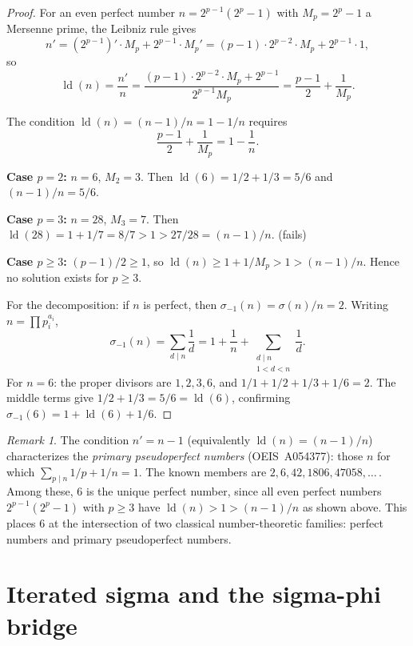 \documentclass[11pt]{amsart}
\theoremstyle{remark}
\newtheorem*{remark}{Remark}
\begin{document}
\begin{proof}
For an even perfect number $n = 2^{p-1}(2^p - 1)$ with
$M_p = 2^p - 1$ a Mersenne prime, the Leibniz rule gives
\[
  n' = (2^{p-1})' \cdot M_p + 2^{p-1} \cdot M_p'
     = (p-1) \cdot 2^{p-2} \cdot M_p + 2^{p-1} \cdot 1,
\]
so
\[
  \operatorname{ld}(n) = \frac{n'}{n}
  = \frac{(p-1) \cdot 2^{p-2} \cdot M_p + 2^{p-1}}{2^{p-1} M_p}
  = \frac{p-1}{2} + \frac{1}{M_p}.
\]

The condition $\operatorname{ld}(n) = (n-1)/n = 1 - 1/n$ requires
\[
  \frac{p-1}{2} + \frac{1}{M_p} = 1 - \frac{1}{n}.
\]

\textbf{Case $p = 2$:} $n = 6$, $M_2 = 3$.
Then $\operatorname{ld}(6) = 1/2 + 1/3 = 5/6$
and $(n-1)/n = 5/6$. \checkmark

\textbf{Case $p = 3$:} $n = 28$, $M_3 = 7$.
Then $\operatorname{ld}(28) = 1 + 1/7 = 8/7 > 1 > 27/28 = (n-1)/n$. (fails)

\textbf{Case $p \geq 3$:}
$(p-1)/2 \geq 1$, so $\operatorname{ld}(n) \geq 1 + 1/M_p > 1 > (n-1)/n$.
Hence no solution exists for $p \geq 3$.

For the decomposition: if $n$ is perfect, then
$\sigma_{-1}(n) = \sigma(n)/n = 2$. Writing $n = \prod p_i^{a_i}$,
\[
  \sigma_{-1}(n) = \sum_{d \mid n} \frac{1}{d}
  = 1 + \frac{1}{n} + \sum_{\substack{d \mid n \\ 1 < d < n}} \frac{1}{d}.
\]
For $n = 6$: the proper divisors are $1, 2, 3, 6$, and
$1/1 + 1/2 + 1/3 + 1/6 = 2$.
The middle terms give $1/2 + 1/3 = 5/6 = \operatorname{ld}(6)$,
confirming $\sigma_{-1}(6) = 1 + \operatorname{ld}(6) + 1/6$.
\end{proof}

\begin{remark}
The condition $n' = n - 1$ (equivalently $\operatorname{ld}(n) = (n-1)/n$)
characterizes the \emph{primary pseudoperfect numbers}
(OEIS~A054377): those $n$ for which
$\sum_{p \mid n} 1/p + 1/n = 1$.
The known members are $2, 6, 42, 1806, 47058, \ldots$\,.
Among these, $6$ is the unique perfect number, since all
even perfect numbers $2^{p-1}(2^p-1)$ with $p \geq 3$
have $\operatorname{ld}(n) > 1 > (n-1)/n$ as shown above.
This places $6$ at the intersection of two classical
number-theoretic families: perfect numbers and primary
pseudoperfect numbers.
\end{remark}

\section{Iterated sigma and the sigma-phi bridge}
\end{document}
